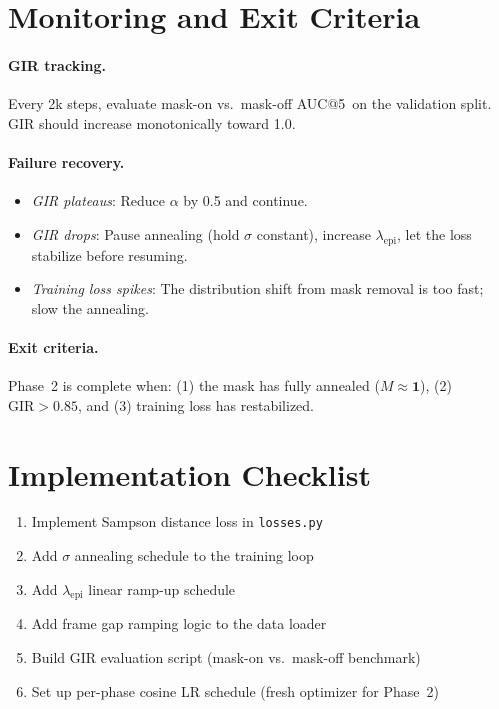 \documentclass[11pt,a4paper]{article}
\begin{document}
\section{Monitoring and Exit Criteria}

\paragraph{GIR tracking.}  Every 2k steps, evaluate mask-on vs.\ mask-off AUC@5\textdegree\ on the validation split.  GIR should increase monotonically toward 1.0.

\paragraph{Failure recovery.}
\begin{itemize}[leftmargin=*]
    \item \textit{GIR plateaus}: Reduce $\alpha$ by 0.5 and continue.
    \item \textit{GIR drops}: Pause annealing (hold $\sigma$ constant), increase $\lambda_{\text{epi}}$, let the loss stabilize before resuming.
    \item \textit{Training loss spikes}: The distribution shift from mask removal is too fast; slow the annealing.
\end{itemize}

\paragraph{Exit criteria.} Phase~2 is complete when: (1) the mask has fully annealed ($M\approx\mathbf{1}$), (2) $\text{GIR}>0.85$, and (3) training loss has restabilized.

\section{Implementation Checklist}

\begin{enumerate}[leftmargin=*]
    \item Implement Sampson distance loss in \texttt{losses.py}
    \item Add $\sigma$ annealing schedule to the training loop
    \item Add $\lambda_{\text{epi}}$ linear ramp-up schedule
    \item Add frame gap ramping logic to the data loader
    \item Build GIR evaluation script (mask-on vs.\ mask-off benchmark)
    \item Set up per-phase cosine LR schedule (fresh optimizer for Phase~2)
\end{enumerate}
\end{document}
